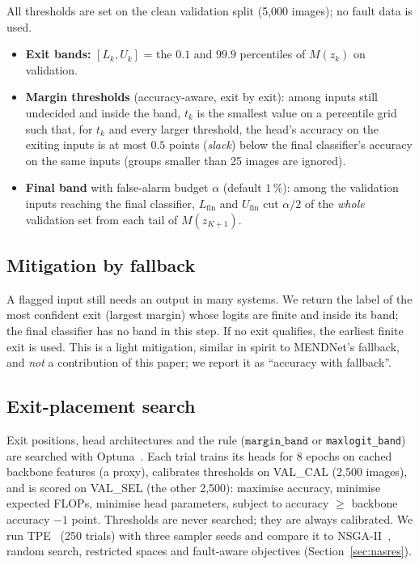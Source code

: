 \documentclass[10pt,a4paper]{article}
\newcommand{\meth}[1]{\texttt{#1}}
\newcommand{\ours}{\meth{margin\_band}}
\begin{document}
All thresholds are set on the clean validation split (5{,}000 images); no fault data is used.
\begin{itemize}
  \item \textbf{Exit bands:} $[L_k,U_k]$ = the $0.1$ and $99.9$ percentiles of $M(z_k)$ on validation.
  \item \textbf{Margin thresholds} (accuracy-aware, exit by exit): among inputs still undecided and inside the
        band, $t_k$ is the smallest value on a percentile grid such that, for $t_k$ and every larger
        threshold, the head's accuracy on the exiting inputs is at most $0.5$ points (\emph{slack}) below
        the final classifier's accuracy on the same inputs (groups smaller than 25 images are ignored).
  \item \textbf{Final band} with false-alarm budget $\alpha$ (default $1\,\%$): among the validation inputs
        reaching the final classifier, $L_{\mathrm{fin}}$ and $U_{\mathrm{fin}}$ cut $\alpha/2$ of the
        \emph{whole} validation set from each tail of $M(z_{K+1})$.
\end{itemize}

\subsection{Mitigation by fallback}\label{sec:fallback}

A flagged input still needs an output in many systems. We return the label of the most confident exit
(largest margin) whose logits are finite and inside its band; the final classifier has no band in this
step. If no exit qualifies, the earliest finite exit is used. This is a light mitigation, similar in spirit
to MENDNet's fallback, and \emph{not} a contribution of this paper; we report it as ``accuracy with
fallback''.

\subsection{Exit-placement search}\label{sec:nas}

Exit positions, head architectures and the rule ($\ours$ or \meth{maxlogit\_band}) are searched with
Optuna~\cite{optuna}. Each trial trains its heads for 8 epochs on cached backbone features (a proxy),
calibrates thresholds on VAL\_CAL (2{,}500 images), and is scored on VAL\_SEL (the other 2{,}500):
maximise accuracy, minimise expected FLOPs, minimise head parameters, subject to accuracy $\ge$ backbone
accuracy $-1$ point. Thresholds are never searched; they are always calibrated. We run TPE~\cite{tpe}
(250 trials) with three sampler seeds and compare it to NSGA-II~\cite{nsga2}, random search,
restricted spaces and fault-aware objectives (Section~\ref{sec:nasres}).
\end{document}
